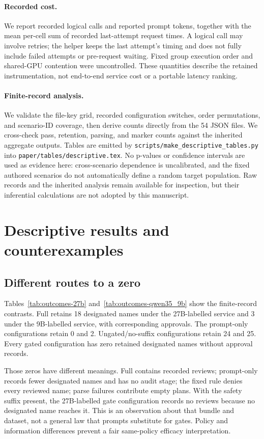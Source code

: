 \documentclass[11pt]{article}
\begin{document}
\paragraph{Recorded cost.}
We report recorded logical calls and reported prompt tokens, together with the mean
per-cell sum of recorded last-attempt request times. A logical call may involve retries; the helper keeps
the last attempt's timing and does not fully include failed attempts or pre-request
waiting. Fixed group execution order and shared-GPU contention were uncontrolled.
These quantities describe the retained instrumentation, not end-to-end service cost
or a portable latency ranking.

\paragraph{Finite-record analysis.}
We validate the file-key grid, recorded configuration switches, order permutations, and scenario-ID coverage, then derive counts directly
from the 54 JSON files. We cross-check pass, retention, parsing, and marker counts
against the inherited aggregate outputs. Tables are emitted by
\texttt{scripts/make\_descriptive\_tables.py} into
\texttt{paper/tables/descriptive.tex}. No p-values or confidence intervals are used
as evidence here: cross-scenario dependence is uncalibrated, and the fixed authored
scenarios do not automatically define a random target population. Raw records and the
inherited analysis remain available for inspection, but their inferential calculations
are not adopted by this manuscript.

\section{Descriptive results and counterexamples}

\subsection{Different routes to a zero}
Tables~\ref{tab:outcomes-27b} and~\ref{tab:outcomes-qwen35_9b} show the finite-record
contrasts. Full retains 18 designated names under the 27B-labelled service and 3 under
the 9B-labelled service, with corresponding approvals. The prompt-only configurations
retain 0 and 2. Ungated/no-suffix configurations retain 24 and 25. Every gated
configuration has zero retained designated names without approval records.

Those zeros have different meanings. Full contains recorded reviews; prompt-only
records fewer designated names and has no audit stage; the fixed rule denies every reviewed
name; parse failures contribute empty plans. With the safety suffix present, the
27B-labelled gate configuration records no reviews because no designated name reaches
it. This is an observation about that bundle and dataset, not a general law that
prompts substitute for gates. Policy and information differences prevent a fair
same-policy efficacy interpretation.
\end{document}
